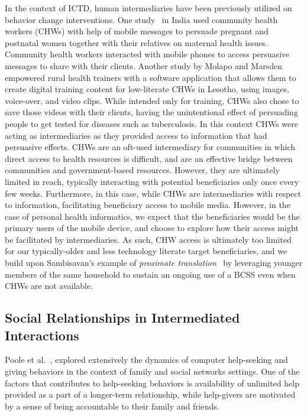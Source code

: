 \documentclass{sig-alternate}
\begin{document}
In the context of ICTD, human intermediaries have been previously utilized on
behavior change interventions. One study~\cite{ramachandran2010mobile,ramachandran2010research} in India used community
health workers (CHWs) with help of mobile messages to persuade pregnant and postnatal
women together with their relatives on maternal health issues. Community
health workers interacted with mobile phones to access persuasive messages to
share with their clients. Another study by Molapo and Marsden~\cite{molapo2013software} empowered rural health trainers with a software
application that allows them to create digital  training  content  for 
low-literate 
CHWs in Lesotho, using images, voice-over, and  video clips.
While intended only for training, CHWs also chose to save those videos with their 
clients, having the unintentional
effect of persuading people to get tested for diseases such as
tuberculosis. In this context CHWs were acting as intermediaries as they
provided access to information that had persuasive effects. 
CHWs are an oft-used intermediary for communities in which direct access to 
health resources is difficult, and are an effective bridge between communities
and government-based resources.  However, they are ultimately limited in reach,
typically interacting with potential beneficiaries only once every few weeks.
Furthermore, in this case, while CHWs are intermediaries with respect to 
information, facilitating beneficiary access to mobile media.  However, in the
case of personal health informatics, we expect that the beneficiaries would
be the primary users of the mobile device, and choose to explore how their
access might be facilitated by intermediaries. As such, CHW access is 
ultimately too limited for our typically-older and less technology literate
target beneficiaries, and we build upon Sambisavan's example of {\em{proximate translation}}~\cite{sambasivan2010} by leveraging younger members of the same household to sustain an ongoing use of a BCSS even when CHWs are not available.


\subsection{Social Relationships in Intermediated Interactions}

Poole et al.~\cite{poole:chh}, explored extensively the dynamics of computer
help-seeking and giving behaviors in the context of family and social networks
settings. One of the factors that contributes to help-seeking behaviors is 
availability of unlimited help provided as a part of a
longer-term relationship, while  help-givers are motivated by a sense
of being accountable to their family and friends.
\end{document}
